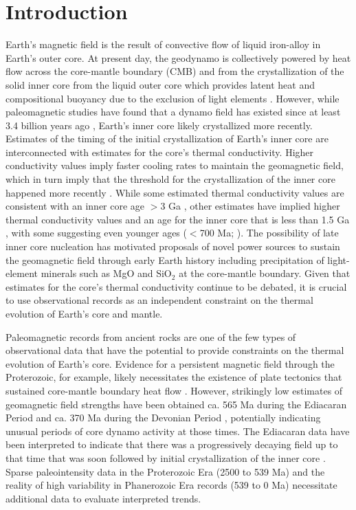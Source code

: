 \section{Introduction}
Earth's magnetic field is the result of convective flow of liquid iron-alloy in Earth's outer core. At present day, the geodynamo is collectively powered by heat flow across the core-mantle boundary (CMB) and from the crystallization of the solid inner core from the liquid outer core which provides latent heat and compositional buoyancy due to the exclusion of light elements \citep{Buffett2000a}. However, while paleomagnetic studies have found that a dynamo field has existed since at least 3.4 billion years ago \citep{Selkin2007a, Biggin2011a, Tarduno2014a, Brenner2020a}, Earth's inner core likely crystallized more recently. Estimates of the timing of the initial crystallization of Earth's inner core are interconnected with estimates for the core's thermal conductivity. Higher conductivity values imply faster cooling rates to maintain the geomagnetic field, which in turn imply that the threshold for the crystallization of the inner core happened more recently \citep{Davies2015a}. While some estimated thermal conductivity values are consistent with an inner core age $>$3 Ga \citep{Gubbins2004a, Konopkova2016a}, other estimates have implied higher thermal conductivity values and an age for the inner core that is less than 1.5 Ga \citep{Pozzo2012a, Koker2012a, Gomi2013a, Zhang2020b, Frost2022a}, with some suggesting even younger ages ($<$700 Ma; \cite{Labrosse2015a, Ohta2016a, Pozzo2022a}). The possibility of late inner core nucleation has motivated proposals of novel power sources to sustain the geomagnetic field through early Earth history including precipitation of light-element minerals such as MgO \citep{Badro2016a, ORourke2016a, ORourke2016b} and SiO$_2$ \citep{Mittal2020a} at the core-mantle boundary. Given that estimates for the core's thermal conductivity continue to be debated, it is crucial to use observational records as an independent constraint on the thermal evolution of Earth's core and mantle.

Paleomagnetic records from ancient rocks are one of the few types of observational data that have the potential to provide constraints on the thermal evolution of Earth’s core. Evidence for a persistent magnetic field through the Proterozoic, for example, likely necessitates the existence of plate tectonics that sustained core-mantle boundary heat flow \citep{Swanson-Hysell2021c}. However, strikingly low estimates of geomagnetic field strengths have been obtained ca. 565 Ma during the Ediacaran Period \citep{Bono2019a, Shcherbakova2019a,Thallner2021b} and ca. 370 Ma during the Devonian Period \citep{Shcherbakova2017a, Shcherbakova2021a, Hawkins2021a}, potentially indicating unusual periods of core dynamo activity at those times. The Ediacaran data have been interpreted to indicate that there was a progressively decaying field up to that time that was soon followed by initial crystallization of the inner core \citep{Bono2019a}. Sparse paleointensity data in the Proterozoic Era (2500 to 539 Ma) and the reality of high variability in Phanerozoic Era records (539 to 0 Ma) necessitate additional data to evaluate interpreted trends. 


